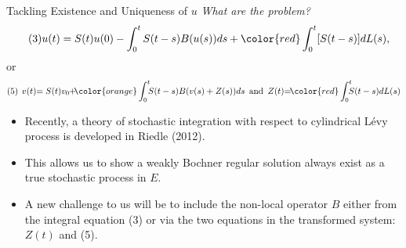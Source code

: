 \documentclass[xcolor=dvipsnames,leqno]{beamer}
\begin{document}
\begin{frame}{Tackling Existence and Uniqueness of $u$}
\emph{What are the problem?} 
\begin{align*}\tag{3}
	u(t)&=S(t)u(0)-\int_{0}^{t} S(t-s)B(u(s))ds+{\color{red}\int_{0}^{t}[S(t-s)]dL(s),}
\end{align*}
or
\begin{align*}
(5)\quad\hspace{-0.20cm}	v(t)\hspace{-0.10cm}&=S(t)v_0\hspace{-0.10cm}+\hspace{-0.15cm}{\color{orange}\int_{0}^{t}\hspace{-0.15cm}S(t-s)B(v(s)+Z(s))ds}\,\,\,\text{and}\,\,\, Z(t)\hspace{-0.35cm}&=\hspace{-0.15cm}{\color{red}\int_{0}^t\hspace{-0.20cm}S(t-s)dL(s)}
\end{align*}
	\begin{itemize}
		\item Recently, {\color{purple}a theory of stochastic integration with respect to cylindrical L\'evy process} is developed in Riedle (2012).
		\item This allows us to show a weakly Bochner regular solution always exist as a true stochastic process in $E$.
		\item  A new challenge to us will be to include the  non-local operator $B$ either from the integral equation (3) or via the two equations in the transformed system: $Z(t)$ and (5). 

\end{itemize}
\end{frame}
\end{document}
